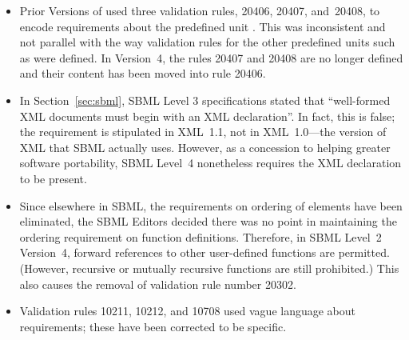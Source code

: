 \begin{blockChanged}
\begin{itemize}
\item Prior Versions of \sbmltwo used three validation rules,
  20406, 20407, and~20408, to encode requirements about the
  predefined unit .  This was inconsistent and not
  parallel with the way validation rules for the other predefined
  units such as  were defined.  In Version~4, the
  rules 20407 and 20408 are no longer defined and their content
  has been moved into rule 20406.


\item In Section~\ref{sec:sbml}, SBML Level 3 specifications
  stated that ``well-formed XML documents must begin with an XML
  declaration''.  In fact, this is false; the requirement is
  stipulated in XML~1.1, not in XML~1.0---the version of XML that
  SBML actually uses.  However, as a concession to helping greater
  software portability, SBML Level~4 nonetheless requires the XML
  declaration to be present.

\item Since elsewhere in SBML, the requirements on ordering of
  elements have been eliminated, the SBML Editors decided there
  was no point in maintaining the ordering requirement on function
  definitions.  Therefore, in SBML Level~2 Version~4, forward
  references to other user-defined functions are permitted.
  (However, recursive or mutually recursive functions are still
  prohibited.)  This also causes the removal of validation rule
  number 20302.

\item Validation rules 10211, 10212, and 10708 used vague language
  about requirements; these have been corrected to be specific.

\end{itemize}

\end{blockChanged}



\renewcommand{\thesubsection}{\Alph{section}.\arabic{subsection}}
